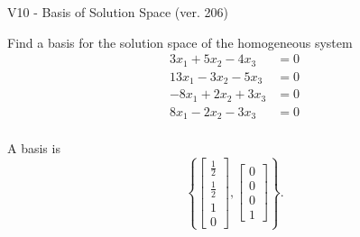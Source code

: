\begin{exercise}
  \begin{exerciseTitle}V10 - Basis of Solution Space (ver. 206)\end{exerciseTitle}
  \begin{exerciseStatement}
    Find a basis for the solution space of the homogeneous system 
\begin{align*}
 3 x_ 1 + 5 x_ 2 -4 x_ 3 &= 0  \\ 
  13 x_ 1 -3 x_ 2 -5 x_ 3 &= 0  \\ 
  -8 x_ 1 + 2 x_ 2 + 3 x_ 3 &= 0  \\ 
  8 x_ 1 -2 x_ 2 -3 x_ 3 &= 0  \\ 
 \end{align*}


 
  \end{exerciseStatement}

  \begin{exerciseAnswer}
   A basis is   
\[\left\{\left[\begin{array}{c}
\frac{1}{2} \\
\frac{1}{2} \\
1 \\
0
\end{array}\right] , \left[\begin{array}{c}
0 \\
0 \\
0 \\
1
\end{array}\right]\right\}.\]

  


  \end{exerciseAnswer}
\end{exercise}